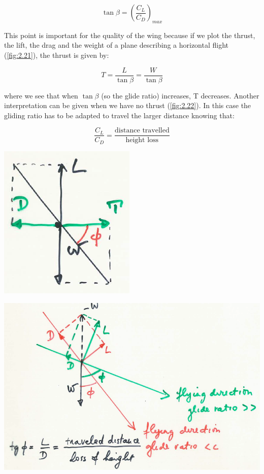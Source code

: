 			\begin{equation}
			\tan \beta = \left(\frac{C_L}{C_D}\right)_{max}
			\end{equation}						
			 
			This point is important for the quality of the wing because if we plot the thrust, the lift, the drag and the weight of a plane describing a horizontal flight (\autoref{fig:2.21}), the thrust is given by:
			
			\begin{equation}
			T = \frac{L}{\tan \beta} = \frac{W}{\tan \beta}
			\end{equation}
			
			where we see that when $\tan \beta$ (so the glide ratio) increases, T decreases. Another interpretation can be given when we have no thrust (\autoref{fig:2.22}). In this case the gliding ratio has to be adapted to travel the larger distance knowing that:
			
			\begin{equation}
			\frac{C_L}{C_D} = \frac{\mbox{distance travelled}}{\mbox{height loss}}
			\end{equation}
			
			\begin{center}
			\begin{minipage}{0.3\textwidth}
			\includegraphics[scale=0.6]{ch2/22}
			\label{fig:2.21}
			\end{minipage}
			\begin{minipage}{0.5\textwidth}
			\includegraphics[scale=0.3]{ch2/23}
			\label{fig:2.22}
			\end{minipage}
			\end{center}
			
